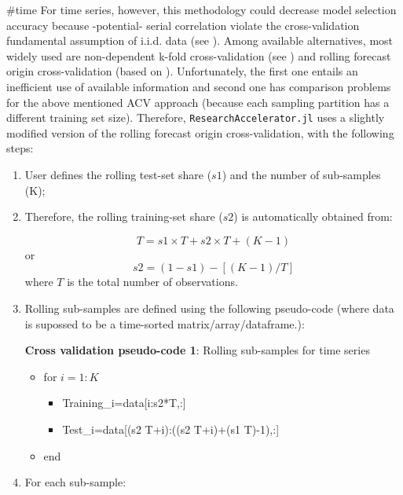 \documentclass{article}
\begin{document}
{{#time}}
For time series, however, this methodology could decrease model selection accuracy because -potential- serial correlation violate the cross-validation fundamental assumption of i.i.d. data (see \cite{bergmeir2012}). Among available alternatives, most widely used are non-dependent k-fold cross-validation (see \cite{bergmeir2018}) and rolling forecast origin cross-validation (based on \cite{hyndman2013}). Unfortunately, the  first one entails an inefficient use of available information and second one has comparison problems for the above mentioned ACV approach (because each sampling partition has a different training set size). Therefore, \verb|ResearchAccelerator.jl| uses a slightly modified version of the rolling forecast origin cross-validation, with the following steps:

\begin{enumerate}
\item User defines the rolling test-set share ($s1$) and the number of sub-samples (K);
\item Therefore, the rolling training-set share ($s2$) is automatically obtained from:

\begin{equation}
  T=s1 \times T+s2 \times T+(K-1)
\end{equation}
or
\begin{equation}
  s2=(1-s1)-[(K-1)/T]
\end{equation}
where $T$ is the total number of observations.
\item Rolling sub-samples are defined using the following pseudo-code (where data is supossed to be a time-sorted matrix/array/dataframe.):

\begin{algorithm}
\caption*{\textbf{Cross validation pseudo-code 1}: Rolling sub-samples for time series}
\begin{itemize}
  \item[] for $i=1:K$
  \begin{itemize}
    \item[]  Training\_i=data[i:s2*T,:]
    \item[] Test\_i=data[(s2 \times T+i):((s2 \times T+i)+(s1 \times T)-1),:]
  \end{itemize}
  \item[] end
\end{itemize}
\end{algorithm}

\item For each sub-sample:


\end{enumerate}
\end{document}
